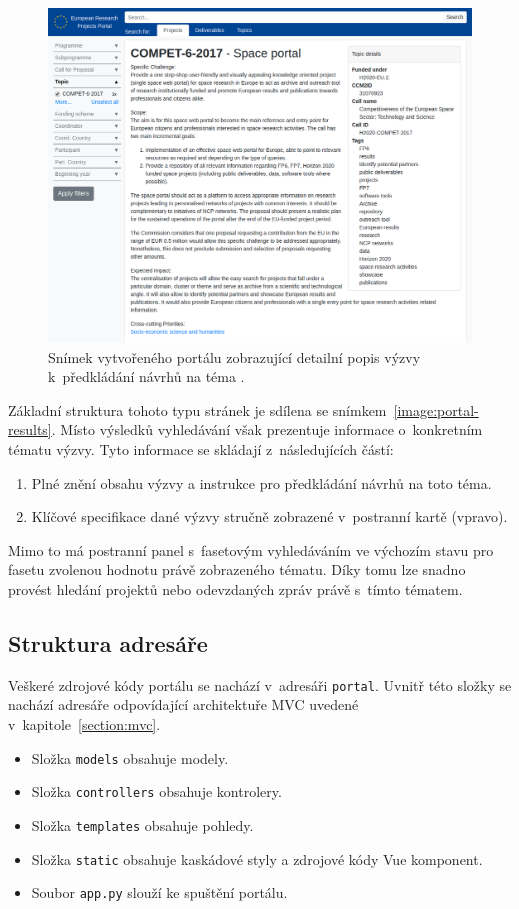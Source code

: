 \begin{figure}[H]
	\centering
	\includegraphics[width=\textwidth]{obrazky-figures/my-topic.png}
	\caption{Snímek vytvořeného portálu zobrazující detailní popis výzvy k~předkládání návrhů na téma .}
	\label{image:portal-detail}
\end{figure}

Základní struktura tohoto typu stránek je sdílena se snímkem~\ref{image:portal-results}. Místo výsledků vyhledávání však prezentuje informace o~konkretním tématu výzvy. Tyto informace se skládají z~následujících částí:
\begin{enumerate}
    \item Plné znění obsahu výzvy a instrukce pro předkládání návrhů na toto téma.
    \item Klíčové specifikace dané výzvy stručně zobrazené v~postranní kartě (vpravo).
\end{enumerate}

Mimo to má postranní panel s~fasetovým vyhledáváním ve výchozím stavu pro fasetu  zvolenou hodnotu právě zobrazeného tématu. Díky tomu lze snadno provést hledání projektů nebo odevzdaných zpráv právě s~tímto tématem.

\subsection{Struktura adresáře}
Veškeré zdrojové kódy portálu se nachází v~adresáři \texttt{portal}. Uvnitř této složky se nachází adresáře odpovídající architektuře MVC uvedené v~kapitole~\ref{section:mvc}.
\begin{itemize}
  \item Složka \texttt{models} obsahuje modely.
  \item Složka \texttt{controllers} obsahuje kontrolery.
  \item Složka \texttt{templates} obsahuje pohledy.
  \item Složka \texttt{static} obsahuje kaskádové styly a zdrojové kódy Vue komponent.
  \item Soubor \texttt{app.py} slouží ke spuštění portálu.
\end{itemize}

